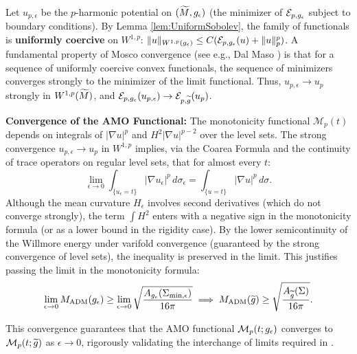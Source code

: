 \begin{corollary}
Let $u_{p,\epsilon}$ be the $p$-harmonic potential on $(\widetilde{M}, g_{\epsilon})$ (the minimizer of $\mathcal{E}_{p,g_{\epsilon}}$ subject to boundary conditions).
By Lemma \ref{lem:UniformSobolev}, the family of functionals is \textbf{uniformly coercive} on $W^{1,p}$: $\|u\|_{W^{1,p}(g_{\epsilon})} \le C (\mathcal{E}_{p,g_{\epsilon}}(u) + \|u\|_p^p)$.
A fundamental property of Mosco convergence (see e.g., Dal Maso \cite{dalmaso1993}) is that for a sequence of uniformly coercive convex functionals, the sequence of minimizers converges strongly to the minimizer of the limit functional.
Thus, $u_{p,\epsilon} \to u_p$ strongly in $W^{1,p}(\widetilde{M})$, and $\mathcal{E}_{p,g_{\epsilon}}(u_{p,\epsilon}) \to \mathcal{E}_{p,\widetilde{g}}(u_p)$.

\textbf{Convergence of the AMO Functional:}
The monotonicity functional $\mathcal{M}_p(t)$ depends on integrals of $|\nabla u|^p$ and $H^2 |\nabla u|^{p-2}$ over the level sets. The strong convergence $u_{p,\epsilon} \to u_p$ in $W^{1,p}$ implies, via the Coarea Formula and the continuity of trace operators on regular level sets, that for almost every $t$:
\[ \lim_{\epsilon \to 0} \int_{\{u_\epsilon=t\}} |\nabla u_\epsilon|^p \, d\sigma_\epsilon = \int_{\{u=t\}} |\nabla u|^p \, d\sigma. \]
Although the mean curvature $H_\epsilon$ involves second derivatives (which do not converge strongly), the term $\int H^2$ enters with a negative sign in the monotonicity formula (or as a lower bound in the rigidity case). By the lower semicontinuity of the Willmore energy under varifold convergence (guaranteed by the strong convergence of level sets), the inequality is preserved in the limit.
This justifies passing the limit in the monotonicity formula:
\[ \lim_{\epsilon \to 0} M_{\mathrm{ADM}}(g_{\epsilon}) \ge \lim_{\epsilon \to 0} \sqrt{\frac{A_{g_{\epsilon}}(\Sigma_{\min,\epsilon})}{16\pi}} \implies M_{\mathrm{ADM}}(\widetilde{g}) \ge \sqrt{\frac{A_{\widetilde{g}}(\Sigma)}{16\pi}}. \]
\end{corollary}
This convergence guarantees that the AMO functional $\mathcal{M}_p(t; g_{\epsilon})$ converges to $\mathcal{M}_p(t; \widetilde{g})$ as $\epsilon\to 0$, rigorously validating the interchange of limits required in .

